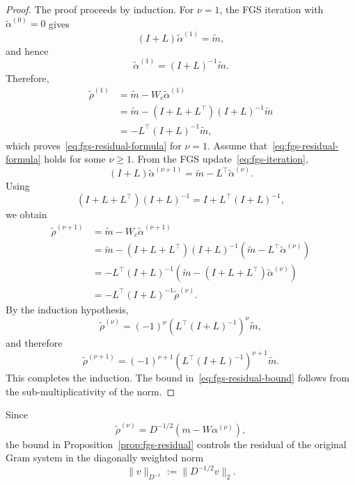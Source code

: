 \documentclass[pdflatex,sn-mathphys-num]{sn-jnl}%
\begin{document}
\begin{proof}
The proof proceeds by induction. For $\nu=1$, the FGS iteration with
$\widetilde{\alpha}^{(0)}=0$ gives
\[
(I+L)\widetilde{\alpha}^{(1)}=\widetilde{m},
\]
and hence
\[
\widetilde{\alpha}^{(1)}
=
(I+L)^{-1}\widetilde{m}.
\]
Therefore,
\begin{align*}
\widetilde{\rho}^{(1)}
&=
\widetilde{m}
-
W_c\widetilde{\alpha}^{(1)}
\\
&=
\widetilde{m}
-
(I+L+L^\top)(I+L)^{-1}\widetilde{m}
\\
&=
-L^\top(I+L)^{-1}\widetilde{m},
\end{align*}
which proves~\eqref{eq:fgs-residual-formula} for $\nu=1$.
Assume that~\eqref{eq:fgs-residual-formula} holds for some $\nu\geq1$.
From the FGS update~\eqref{eq:fgs-iteration},
\[
(I+L)\widetilde{\alpha}^{(\nu+1)}
=
\widetilde{m}
-
L^\top\widetilde{\alpha}^{(\nu)}.
\]
Using
\[
(I+L+L^\top)(I+L)^{-1}
=
I+L^\top(I+L)^{-1},
\]
we obtain
\begin{align*}
\widetilde{\rho}^{(\nu+1)}
&=
\widetilde{m}
-
W_c\widetilde{\alpha}^{(\nu+1)}
\\
&=
\widetilde{m}
-
(I+L+L^\top)(I+L)^{-1}
\left(
\widetilde{m}
-
L^\top\widetilde{\alpha}^{(\nu)}
\right)
\\
&=
-L^\top(I+L)^{-1}
\left(
\widetilde{m}
-
(I+L+L^\top)\widetilde{\alpha}^{(\nu)}
\right)
\\
&=
-L^\top(I+L)^{-1}
\widetilde{\rho}^{(\nu)}.
\end{align*}
By the induction hypothesis,
\[
\widetilde{\rho}^{(\nu)}
=
(-1)^\nu
\left(
L^\top(I+L)^{-1}
\right)^\nu
\widetilde{m},
\]
and therefore
\[
\widetilde{\rho}^{(\nu+1)}
=
(-1)^{\nu+1}
\left(
L^\top(I+L)^{-1}
\right)^{\nu+1}
\widetilde{m}.
\]
This completes the induction. The bound
in~\eqref{eq:fgs-residual-bound} follows from the sub-multiplicativity
of the norm.
\end{proof}
Since
\[
\widetilde{\rho}^{(\nu)}
=
D^{-1/2}
\left(
m-W\alpha^{(\nu)}
\right),
\]
the bound in Proposition~\ref{prop:fgs-residual} controls the residual
of the original Gram system in the diagonally weighted norm
\[
\|v\|_{D^{-1}}
:=
\|D^{-1/2}v\|_2.
\]
\end{document}
